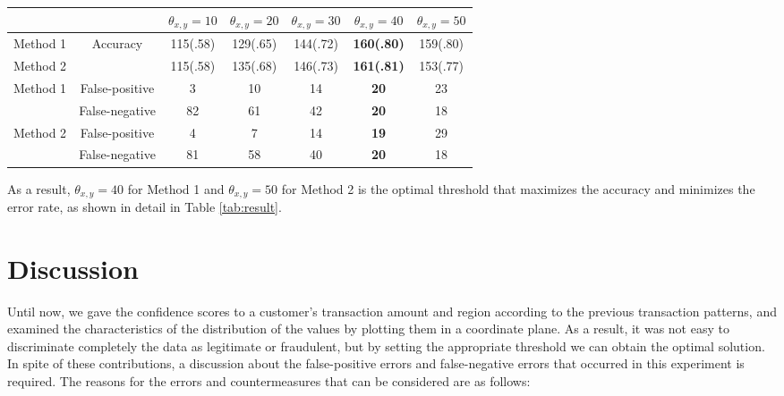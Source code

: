 \documentclass[final,authoryear,5p,times,twocolumn]{elsarticle}
\begin{document}
\begin{table*}[t!]
\begin{center}
    \begin{tabular}{|cc|ccccc|}
    \hline
    ~        & ~              & $\theta_{x,y}=10$ & $\theta_{x,y}=20$ & $\theta_{x,y}=30$ & $\theta_{x,y}=40$ & $\theta_{x,y}=50$ \\ \hline
    Method 1 & Accuracy       & 115(.58)          & 129(.65)          & 144(.72)          & \textbf{160(.80)} & 159(.80)   \\
    Method 2 & ~              & 115(.58)           & 135(.68)          & 146(.73)          & \textbf{161(.81)}& 153(.77)   \\ \hline
    Method 1 & False-positive & 3        & 10        & 14        & \textbf{20}     & 23      \\
    ~        & False-negative & 82       & 61        & 42        & \textbf{20}     & 18      \\
    Method 2 & False-positive & 4        & 7         & 14        & \textbf{19}     & 29      \\
    ~        & False-negative & 81       & 58        & 40        & \textbf{20}     & 18      \\ \hline
    \end{tabular}
    \caption {The accuracy and error rate of each method. Method 1 is a combination method of association rule and GPs (i.e., rectangular markers in Figs. \ref{fig:result7} and \ref{fig:result8}). Method 2 is a combination method of association rule and $AR(5)$ (i.e., circle markers in Figs. \ref{fig:result7} and \ref{fig:result8}). We determined the optimal thresholds with the highest accuracy and the lowest error rates, indicated in bold type.}
    \label{tab:result}
\end{center}
\end{table*}

As a result, $\theta_{x,y}=40$ for Method 1 and $\theta_{x,y}=50$ for Method 2 is the optimal threshold that maximizes the accuracy and minimizes the error rate, as shown in detail in Table \ref{tab:result}.

\section{Discussion}
\label{section:Sec6}
Until now, we gave the confidence scores to a customer's transaction amount and region according to the previous transaction patterns, and examined the characteristics of the distribution of the values by plotting them in a coordinate plane. As a result, it was not easy to discriminate completely the data as legitimate or fraudulent, but by setting the appropriate threshold we can obtain the optimal solution. In spite of these contributions, a discussion about the false-positive errors and false-negative errors that occurred in this experiment is required. The reasons for the errors and countermeasures that can be considered are as follows:
\end{document}
